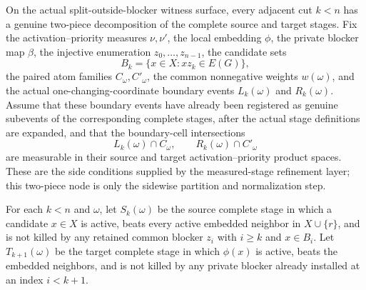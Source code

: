 \begin{helper}
On the actual split-outside-blocker witness surface, every adjacent cut
\(k<n\) has a genuine two-piece decomposition of the complete source and
target stages.  Fix the activation--priority measures \(\nu,\nu'\), the local embedding
\(\phi\), the private blocker map \(\beta\), the injective enumeration
\(z_0,\ldots,z_{n-1}\), the candidate sets
\[
B_k=\{x\in X:xz_k\in E(G)\},
\]
the paired atom families \(C_\omega,C'_\omega\), the common nonnegative
weights \(w(\omega)\), and the actual one-changing-coordinate boundary events
\(L_k(\omega)\) and \(R_k(\omega)\).
Assume that these boundary events have already been registered as genuine
subevents of the corresponding complete stages, after the actual stage
definitions are expanded, and that the boundary-cell intersections
\[
L_k(\omega)\cap C_\omega,\qquad R_k(\omega)\cap C'_\omega
\]
are measurable in their source and target activation--priority product
spaces.  These are the side conditions supplied by the measured-stage
refinement layer; this two-piece node is only the sidewise partition and
normalization step.

For each \(k<n\) and \(\omega\), let \(S_k(\omega)\) be the source complete
stage in which a candidate \(x\in X\) is active, beats every active embedded
neighbor in \(X\cup\{r\}\), and is not killed by any retained common blocker
\(z_i\) with \(i\ge k\) and \(x\in B_i\).  Let \(T_{k+1}(\omega)\) be the
target complete stage in which \(\phi(x)\) is active, beats the embedded
neighbors, and is not killed by any private blocker already installed at an
index \(i<k+1\).


\end{helper}
